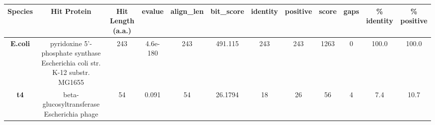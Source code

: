 \begin{tabular}{|c|c|c|c|c|c|c|c|c|c|c|c|} \hline
\textbf{Species} & \textbf{Hit Protein} & \textbf{Hit Length (a.a.)} & \textbf{evalue} & \textbf{align\_len} & \textbf{bit\_score} & \textbf{identity} & \textbf{positive} & \textbf{score} & \textbf{gaps} & \textbf{\% identity} & \textbf{\% positive} \\ \hline
\textbf{E.coli} & pyridoxine 5'-phosphate synthase Escherichia coli str. K-12 substr. MG1655 & 243 & 4.6e-180 & 243 & 491.115 & 243 & 243 & 1263 & 0 & 100.0 & 100.0\\
\textbf{t4} & beta-glucosyltransferase Escherichia phage  & 54 & 0.091 & 54 & 26.1794 & 18 & 26 & 56 & 4 & 7.4 & 10.7\\
\hline \end{tabular}
